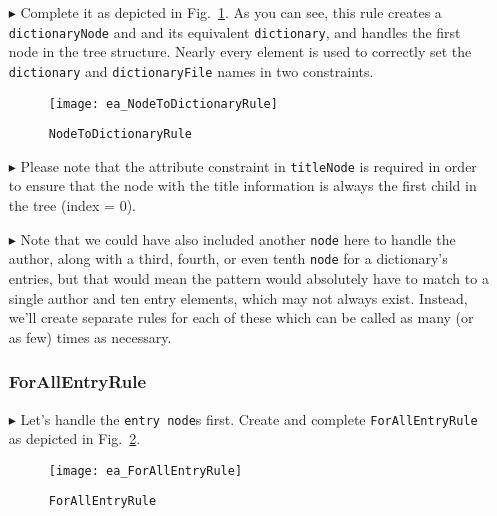 \begin{itemize}
\item[$\blacktriangleright$] Complete it as depicted in Fig.~\ref{ea:NodeToDictionary_Complete}. As you can see, this rule creates a 
\texttt{dictionaryNode} and and its equivalent \texttt{dictionary}, and handles the first node in the tree structure. Nearly every
element is used to correctly set the \texttt{dictionary} and \texttt{dictionaryFile} names in two constraints.

\vspace{0.5cm}

\begin{figure}[htbp]
  \hspace{-0.7cm}
  \texttt{[image: ea\_NodeToDictionaryRule]}
  \caption{\texttt{NodeToDictionaryRule}}
  \label{ea:NodeToDictionary_Complete}
\end{figure}

\vspace{0.5cm}

\item[$\blacktriangleright$] Please note that the attribute constraint in \texttt{titleNode} is required in order to ensure that the node
with the title information is always the first child in the tree (index = 0). 

\newpage

\item[$\blacktriangleright$] Note that we could have also included another \texttt{node} here to handle the author, along with a third, fourth, or even
tenth \texttt{node} for a dictionary's entries, but that would mean the pattern would absolutely have to match to a single author and ten entry elements, which
may not always exist. Instead, we'll create separate rules for each of these which can be called as many (or as few) times as necessary.

\subsubsection{ForAllEntryRule} %

\item[$\blacktriangleright$] Let's handle the \texttt{entry node}s first. Create and complete \texttt{For\-All\-Ent\-ry\-Rule} as depicted in
Fig.~\ref{ea:ForAllEntry_Complete}. 

\vspace{0.5cm}

\begin{figure}[htbp]
\hspace{-0.5cm}
  \texttt{[image: ea\_ForAllEntryRule]}
  \caption{\texttt{ForAllEntryRule}}
  \label{ea:ForAllEntry_Complete}
\end{figure}


\end{itemize}
